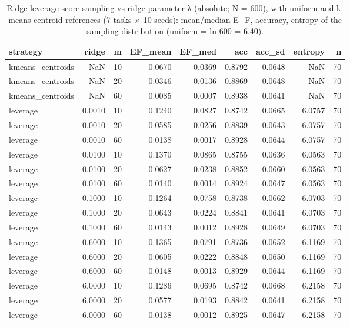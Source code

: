 \begin{table}
\caption{Ridge-leverage-score sampling vs ridge parameter λ (absolute; N = 600), with uniform and k-means-centroid references (7 tasks × 10 seeds): mean/median E_F, accuracy, entropy of the sampling distribution (uniform = ln 600 = 6.40).}
\label{tab:table_leverage_sweep}
\begin{tabular}{lrrrrrrrr}
\toprule
strategy & ridge & m & EF\_mean & EF\_med & acc & acc\_sd & entropy & n \\
\midrule
kmeans\_centroids & NaN & 10 & 0.0670 & 0.0369 & 0.8792 & 0.0648 & NaN & 70 \\
kmeans\_centroids & NaN & 20 & 0.0346 & 0.0136 & 0.8869 & 0.0648 & NaN & 70 \\
kmeans\_centroids & NaN & 60 & 0.0085 & 0.0007 & 0.8938 & 0.0641 & NaN & 70 \\
leverage & 0.0010 & 10 & 0.1240 & 0.0827 & 0.8742 & 0.0665 & 6.0757 & 70 \\
leverage & 0.0010 & 20 & 0.0585 & 0.0256 & 0.8839 & 0.0643 & 6.0757 & 70 \\
leverage & 0.0010 & 60 & 0.0138 & 0.0017 & 0.8928 & 0.0644 & 6.0757 & 70 \\
leverage & 0.0100 & 10 & 0.1370 & 0.0865 & 0.8755 & 0.0636 & 6.0563 & 70 \\
leverage & 0.0100 & 20 & 0.0627 & 0.0238 & 0.8852 & 0.0660 & 6.0563 & 70 \\
leverage & 0.0100 & 60 & 0.0140 & 0.0014 & 0.8924 & 0.0647 & 6.0563 & 70 \\
leverage & 0.1000 & 10 & 0.1264 & 0.0758 & 0.8738 & 0.0662 & 6.0703 & 70 \\
leverage & 0.1000 & 20 & 0.0643 & 0.0224 & 0.8841 & 0.0641 & 6.0703 & 70 \\
leverage & 0.1000 & 60 & 0.0143 & 0.0012 & 0.8928 & 0.0649 & 6.0703 & 70 \\
leverage & 0.6000 & 10 & 0.1365 & 0.0791 & 0.8736 & 0.0652 & 6.1169 & 70 \\
leverage & 0.6000 & 20 & 0.0605 & 0.0222 & 0.8848 & 0.0650 & 6.1169 & 70 \\
leverage & 0.6000 & 60 & 0.0148 & 0.0013 & 0.8929 & 0.0644 & 6.1169 & 70 \\
leverage & 6.0000 & 10 & 0.1286 & 0.0695 & 0.8742 & 0.0668 & 6.2158 & 70 \\
leverage & 6.0000 & 20 & 0.0577 & 0.0193 & 0.8842 & 0.0641 & 6.2158 & 70 \\
leverage & 6.0000 & 60 & 0.0138 & 0.0012 & 0.8925 & 0.0647 & 6.2158 & 70 \\

\end{tabular}
\end{table}
